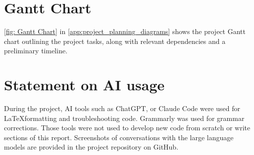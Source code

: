 

\section{Gantt Chart}
\label{sec:planning_gantt_chart}

\autoref{fig: Gantt Chart} in \autoref{app:project_planning_diagrams} shows the project Gantt chart outlining the project tasks, along with relevant dependencies and a preliminary timeline.

\section{Statement on AI usage}

During the project, AI tools such as ChatGPT, or Claude Code were used for \LaTeX formatting and troubleshooting code. Grammarly was used for grammar corrections. Those tools were not used to develop new code from scratch or write sections of this report. Screenshots of conversations with the large language models are provided in the project repository on GitHub. 